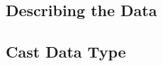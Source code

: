 \documentclass[letterpaper,10pt,english]{sphinxmanual}
\begin{document}
\subsection{Describing the Data}
\label{\detokenize{2020-08-15-Pyspark-Fiscal-Data-Regression:describing-the-data}}
\begin{sphinxVerbatim}[commandchars=\\\{\}]
\end{sphinxVerbatim}


\subsection{Cast Data Type}
\label{\detokenize{2020-08-15-Pyspark-Fiscal-Data-Regression:cast-data-type}}
\end{document}
